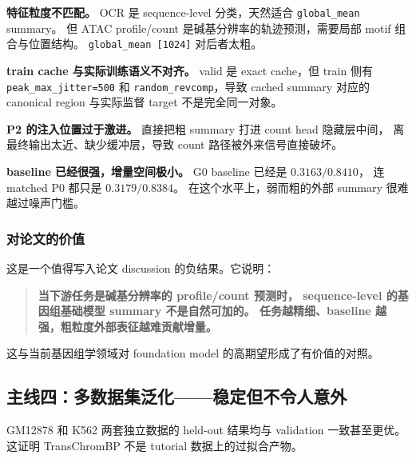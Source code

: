 \documentclass[11pt,a4paper]{ctexart}
\begin{document}
\begin{description}[leftmargin=2em,labelwidth=3em]
  \item[原因 1] \textbf{特征粒度不匹配。}
    OCR 是 sequence-level 分类，天然适合 \texttt{global\_mean} summary。
    但 ATAC profile/count 是碱基分辨率的轨迹预测，需要局部 motif 组合与位置结构。
    \texttt{global\_mean [1024]} 对后者太粗。

  \item[原因 2] \textbf{train cache 与实际训练语义不对齐。}
    valid 是 exact cache，但 train 侧有 \texttt{peak\_max\_jitter=500}
    和 \texttt{random\_revcomp}，导致 cached summary 对应的 canonical region
    与实际监督 target 不是完全同一对象。

  \item[原因 3] \textbf{P2 的注入位置过于激进。}
    直接把粗 summary 打进 count head 隐藏层中间，
    离最终输出太近、缺少缓冲层，导致 count 路径被外来信号直接破坏。

  \item[原因 4] \textbf{baseline 已经很强，增量空间极小。}
    G0 baseline 已经是 $0.3163 / 0.8410$，
    连 matched P0 都只是 $0.3179 / 0.8384$。
    在这个水平上，弱而粗的外部 summary 很难越过噪声门槛。
\end{description}

\subsubsection{对论文的价值}

这是一个值得写入论文 discussion 的负结果。它说明：

\begin{quote}
\textbf{当下游任务是碱基分辨率的 profile/count 预测时，
sequence-level 的基因组基础模型 summary 不是自然可加的。
任务越精细、baseline 越强，粗粒度外部表征越难贡献增量。}
\end{quote}

这与当前基因组学领域对 foundation model 的高期望形成了有价值的对照。

\subsection{主线四：多数据集泛化——稳定但不令人意外}

GM12878 和 K562 两套独立数据的 held-out 结果均与 validation 一致甚至更优。
这证明 TransChromBP 不是 tutorial 数据上的过拟合产物。
\end{document}
